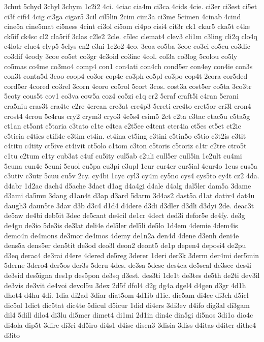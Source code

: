 {3chut
5chyd
3chyl
3chym
1c2i2
4ci.
4ciac
cia4m
ci3ca
4cids
4cie.
ci3er
ci3est
ci5et
ci3f
cifi4
4cig
ci3ga
cigar5
3cil
cil5lin
2cim
cim3a
ci3me
5cimen
4cinab
4cind
cine5a
cine5mat
ci5ness
4cint
ci3ol
ci5om
ci4po
cisi4
cit3r
ck1
ckar5
cka5t
c4ke
ck5if
ck4sc
cl2
cla5rif
3clas
c2le2
2cle.
c5lec
clemat4
clev3
cli1m
c3ling
cli2q
clo4q
c4lotr
clue4
clyp5
5clys
cn2
c3ni
1c2o2
4co.
3coa
co5ba
3coc
co3ci
co5cu
co3dic
co3dif
4cody
3coe
co5et
co3gr
4c3oid
co3inc
4col.
col3a
co3log
5colou
co5ly
co5mas
co4me
co3mo4
comp4
con1
con4ati
con4ch
cond5er
con4ey
con4ie
con3s
con3t
conta5d
3coo
coop4
co3or
cop4e
co3ph
co5pl
co3po
cop4t
2cora
cor5ded
cord5er
4cored
co3rel
3corn
4coro
co5rol
5cort
3cos.
cost3a
cost5er
co5ta
3co3tr
5coty
cous5t
cov1
co3va
cow5a
coz4
co5zi
c1q
cr2
5craf
craft5i
c4ran
5crani
cra5niu
cras3t
cra4te
c2re
4crean
cre3at
cre4p3
5creti
cre4to
cret5or
cri3l
cron4
crost4
4crou
5c4rus
cry2
crym3
cryo3
4c5s4
csim5
2ct
c2ta
c3tac
ctac5u
c5ta5g
ct1an
ct5ant
c5taria
c3tato
c1te
c4tea
c2t5ee
c4tent
cter4ia
ct5es
ct5et
ct2ic
c5ticia
c4tics
ctifi4e
c3tim
ct4in.
ct4ina
ct5ing
c3tini
c5tin5o
c5tio
c3t2is
c3tit
c4titu
c4tity
ct5ive
ct4ivit
ct5olo
c1tom
c3ton
c5toris
c5toriz
c1tr
c2tre
ctro5t
c1tu
c2tum
c1ty
cub3at
c4uf
cu5ity
cul5ab
c2uli
cull5er
cull5in
1c2ult
cu4mi
5cuna
cun4e
5cuni
5cuol
cu5pa
cu3pi
c3upl
1cur
cur4er
cur5ial
4cur4o
1cus
cus5a
c3utiv
c3utr
5cuu
cu5v
2cy.
cy4bi
1cyc
cyl3
cy4m
cy5no
cys4
cys5to
cy4t
cz2
4da.
d4abr
1d2ac
dach4
d5ache
3dact
d1ag
d4a4gi
d4ale
d4alg
dal5ler
dam5a
3dame
d3ami
da5mu
3dang
d1an4t
d3ap
d3ard
5darm
3d4as2
dast5a
d1at
dativ4
dat4u
daugh3
daun5te
3dav
d3b
d3c4
d1d4
d4dere
d3di
d3dler
d3dli
d3dyi
2de.
deac3t
de5aw
de4bi
deb5it
3dec
de5cant
de4cil
de1cr
4dect
ded3i
defor5e
de4fy.
de3g
de4gu
de3io
5de3is
de3lat
deli4e
del5ler
del5li
de5lo
1d4em
4demie
4dem4is
demo4n
de4mons
de3mor
de4mos
4demy
de1n2a
den4d
4dene
d3enh
deni4e
dens5a
dens5er
den5tit
de3od
deo3l
deon2
deont5
de1p
depen4
deposi4
de2pu
d3eq
derac4
de3rai
d4ere
4dered
de5reg
3derer
1deri
der3k
3derm
der4mi
der5min
5derne
3dero4
der5os
der3s
5deru
4des.
de3sa
5desc
des4ca
de5scal
de3sec
des4i
de3sid
des5igna
des1p
des5pon
de3sq
d3est.
des3ti
1de1t
de3tes
de5th
de2ti
dev3il
de3vis
de3vit
de4voi
devol5u
3dex
2d5f
dfol4
d2g
dg4a
dgel4
d4gen
d3gr
4d1h
dhot4
d4hu
4di.
1dia
di2ad
3diar
diat5om
4d1ib
d1ic.
dic5am
di4ce
di3ch
d5icl
dic5ol
1dict
dic5tat
dic4te
5dicul
d5icur
1did
di4ers
3di3ev
d4ifo
dig3al
di3gam
dil4
5dill
dilo4
di3lu
di5mer
dimet4
di1mi
2d1in
din4e
din5gi
di5nos
3di1o
dio4c
di4ola
dip5t
3dire
di3ri
4d5iro
di4s1
d4isc
disen3
3disia
3diss
d4itas
d4iter
dithe4
d3ito
}
